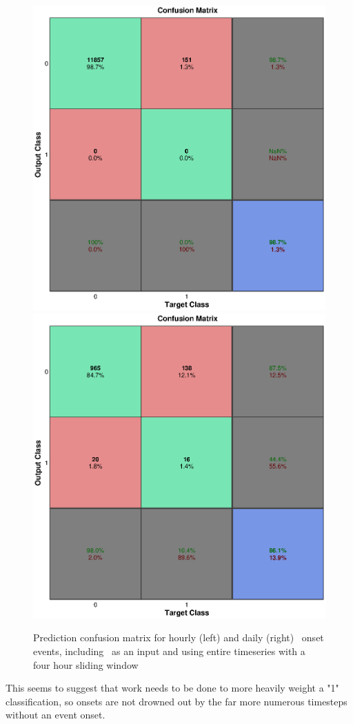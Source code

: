 \begin{figure}[htp!]
	\centering
	\includegraphics[width=0.45\linewidth]{Figures/CH5/NNBinaryOnset-full-hourly-withreq.eps}
	\includegraphics[width=0.45\linewidth]{Figures/CH5/NNBinaryOnset-full-daily-withreq.eps}
	\caption{Prediction confusion matrix for hourly (left) and daily (right) \req\ onset events, including \req\ as an input and using entire timeseries with a four hour sliding window}
	\label{fig:OnsetFullWithreq}
\end{figure}

This seems to suggest that work needs to be done to more heavily weight a "1" classification, so onsets are not drowned out by the far more numerous timesteps without an event onset.